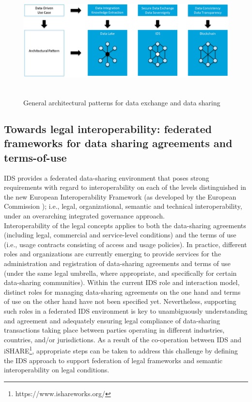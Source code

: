 \begin{figure}[h]
	\begin{Center}
		\includegraphics[width=6.6in,height=2.37in]{./media/image15.png}
		\caption{ General architectural patterns for data exchange and data sharing}
		\label{fig:_general_architectural_patterns_for_data_exchange_and_data_sharing}
	\end{Center}
\end{figure}



\subsection{Towards legal interoperability: federated frameworks for data sharing agreements and terms-of-use}
\label{subsection:schemeowner}

IDS provides a federated data-sharing environment that poses strong requirements with regard to interoperability on each of the levels distinguished in the new European Interoperability Framework (as developed by the European Commission ); i.e., legal, organizational, semantic and technical interoperability, under an overarching integrated governance approach.\\
Interoperability of the legal concepts applies to both the data-sharing agreements (including legal, commercial and service-level conditions) and the terms of use (i.e., usage contracts consisting of access and usage policies). In practice, different roles and organizations are currently emerging to provide services for the administration and registration of data-sharing agreements and terms of use (under the same legal umbrella, where appropriate, and specifically for certain data-sharing communities). 
Within the current IDS role and interaction model, distinct roles for managing data-sharing agreements on the one hand and terms of use on the other hand have not been specified yet. Nevertheless, supporting such roles in a federated IDS environment is key to unambiguously understanding and agreement and adequately ensuring legal compliance of data-sharing transactions taking place between parties operating in different industries, countries, and/or jurisdictions.
As a result of the co-operation between IDS and iSHARE\footnote{https://www.ishareworks.org/}, appropriate steps can be taken to address this challenge by defining the IDS approach to support federation of legal frameworks and semantic interoperability on legal conditions.


